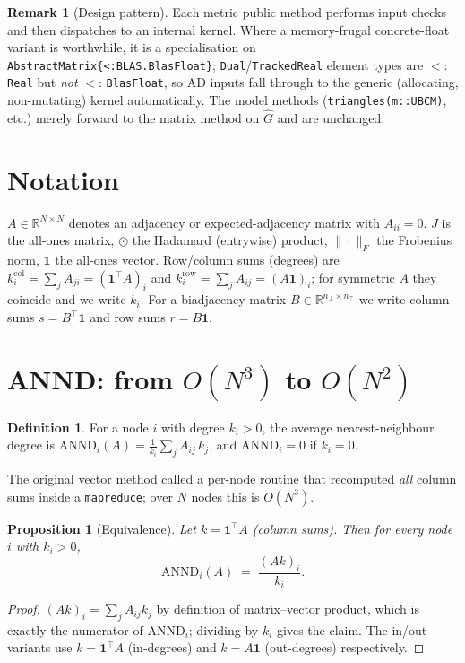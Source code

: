 \documentclass[11pt]{article}
\theoremstyle{plain}
\newtheorem{proposition}{Proposition}
\theoremstyle{definition}
\newtheorem{definition}{Definition}
\newtheorem{remark}{Remark}
\newcommand{\R}{\mathbb{R}}
\newcommand{\Ghat}{\hat{G}}
\newcommand{\had}{\odot} %
\begin{document}
\begin{remark}[Design pattern]
Each metric public method performs input checks and then dispatches to an internal kernel. Where a
memory-frugal concrete-float variant is worthwhile, it is a specialisation on
\texttt{AbstractMatrix\{<:BLAS.BlasFloat\}}; \texttt{Dual}/\texttt{TrackedReal} element types are $<:$\,\texttt{Real}
but \emph{not} $<:$\,\texttt{BlasFloat}, so AD inputs fall through to the generic (allocating, non-mutating)
kernel automatically. The model methods (\texttt{triangles(m::UBCM)}, etc.) merely forward to the matrix
method on $\Ghat$ and are unchanged.
\end{remark}

\section{Notation}
\label{sec:notation}
$A\in\R^{N\times N}$ denotes an adjacency or expected-adjacency matrix with $A_{ii}=0$. $J$ is the all-ones
matrix, $\had$ the Hadamard (entrywise) product, $\|\cdot\|_F$ the Frobenius norm, $\mathbf 1$ the all-ones
vector. Row/column sums (degrees) are $k^{\text{col}}_i=\sum_j A_{ji}=(\mathbf 1^\top A)_i$ and
$k^{\text{row}}_i=\sum_j A_{ij}=(A\mathbf 1)_i$; for symmetric $A$ they coincide and we write $k_i$. For a
biadjacency matrix $B\in\R^{n_\perp\times n_\top}$ we write column sums $s=B^\top\mathbf 1$ and row sums
$r=B\mathbf 1$.

\section{ANND: from $O(N^3)$ to $O(N^2)$}
\label{sec:annd}

\begin{definition}
For a node $i$ with degree $k_i>0$, the average nearest-neighbour degree is
$\mathrm{ANND}_i(A)=\frac{1}{k_i}\sum_{j} A_{ij}\,k_j$, and $\mathrm{ANND}_i=0$ if $k_i=0$.
\end{definition}

The original vector method called a per-node routine that recomputed \emph{all} column sums inside a
\texttt{mapreduce}; over $N$ nodes this is $O(N^3)$.

\begin{proposition}[Equivalence]\label{prop:annd}
Let $k=\mathbf 1^\top A$ (column sums). Then for every node $i$ with $k_i>0$,
\[
\mathrm{ANND}_i(A) \;=\; \frac{(A k)_i}{k_i}.
\]
\end{proposition}
\begin{proof}
$(Ak)_i=\sum_j A_{ij}k_j$ by definition of matrix--vector product, which is exactly the numerator of
$\mathrm{ANND}_i$; dividing by $k_i$ gives the claim. The in/out variants use $k=\mathbf 1^\top A$
(in-degrees) and $k=A\mathbf 1$ (out-degrees) respectively.
\end{proof}
\end{document}
